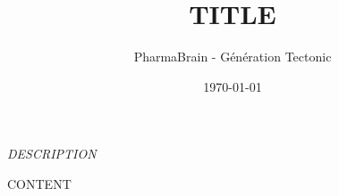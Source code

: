 \documentclass[10pt,a4paper]{article}
\title{\textbf{{{TITLE}}}}
\author{PharmaBrain - Génération Tectonic}
\date{\today}
\begin{document}
\maketitle

\begin{center}
\textit{{{DESCRIPTION}}}
\end{center}

\vspace{1cm}

{{CONTENT}}
\end{document}

